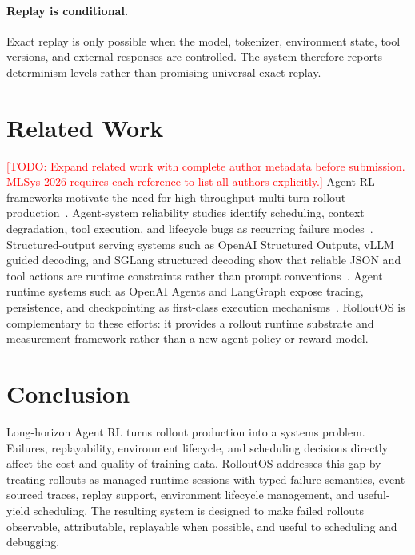 \documentclass{article}
\newcommand{\sys}{RolloutOS}
\newcommand{\todo}[1]{\textcolor{red}{[TODO: #1]}}
\begin{document}
\paragraph{Replay is conditional.}
Exact replay is only possible when the model, tokenizer, environment state, tool versions, and external responses are controlled.
The system therefore reports determinism levels rather than promising universal exact replay.

\section{Related Work}

\todo{Expand related work with complete author metadata before submission. MLSys 2026 requires each reference to list all authors explicitly.}
Agent RL frameworks motivate the need for high-throughput multi-turn rollout production~\citep{zhang2025agentrl,prorlagent2026}.
Agent-system reliability studies identify scheduling, context degradation, tool execution, and lifecycle bugs as recurring failure modes~\citep{agentrm2026,bugstudy2026,wherellmagentsfail2025}.
Structured-output serving systems such as OpenAI Structured Outputs, vLLM guided decoding, and SGLang structured decoding show that reliable JSON and tool actions are runtime constraints rather than prompt conventions~\citep{openaistructuredoutputs2024,vllmstructuredoutputs2026,sglang2023}.
Agent runtime systems such as OpenAI Agents and LangGraph expose tracing, persistence, and checkpointing as first-class execution mechanisms~\citep{openaiagentstracing2026,langgraphpersistence2026}.
\sys{} is complementary to these efforts: it provides a rollout runtime substrate and measurement framework rather than a new agent policy or reward model.

\section{Conclusion}

Long-horizon Agent RL turns rollout production into a systems problem.
Failures, replayability, environment lifecycle, and scheduling decisions directly affect the cost and quality of training data.
\sys{} addresses this gap by treating rollouts as managed runtime sessions with typed failure semantics, event-sourced traces, replay support, environment lifecycle management, and useful-yield scheduling.
The resulting system is designed to make failed rollouts observable, attributable, replayable when possible, and useful to scheduling and debugging.



\end{document}
